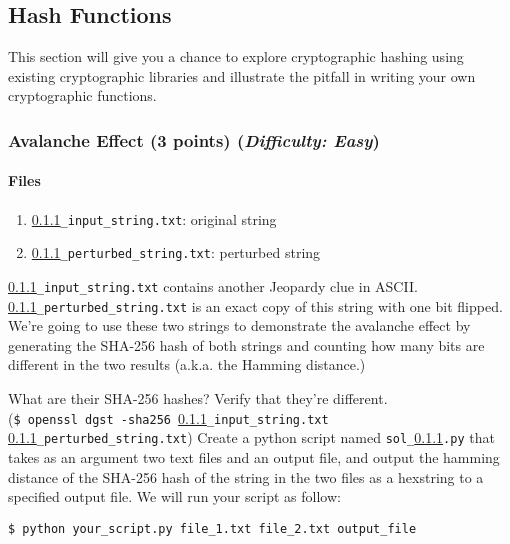 \documentclass[letterpaper,12pt]{report}
\begin{document}
\subsection{Hash Functions}
\label{sec:hash_library}
This section will give you a chance to explore cryptographic hashing using existing cryptographic libraries and illustrate the pitfall in writing your own cryptographic functions.

\subsubsection{Avalanche Effect (3 points)  \hfill\rm\normalsize (\emph{Difficulty: Easy})}
\label{sec:avalanche_effect}
\paragraph{Files}

\begin{enumerate}
\item {\tt \ref{sec:avalanche_effect}\_input\_string.txt}: original string
\item {\tt \ref{sec:avalanche_effect}\_perturbed\_string.txt}: perturbed string
\end{enumerate}

{\tt \ref{sec:avalanche_effect}\_input\_string.txt} contains another Jeopardy clue in ASCII. 
\newline
{\tt \ref{sec:avalanche_effect}\_perturbed\_string.txt} is an exact copy of this string with one bit flipped. We're going to use these two strings to demonstrate the avalanche effect by generating the SHA-256 hash of both strings and counting how many bits are different in the two results (a.k.a. the Hamming distance.)

\smallskip
What are their SHA-256 hashes?  Verify that they're different.\\
(\texttt{\$ openssl dgst -sha256 \ref{sec:avalanche_effect}\_input\_string.txt \ref{sec:avalanche_effect}\_perturbed\_string.txt})
\smallskip
Create a python script named \texttt{sol\_\ref{sec:avalanche_effect}.py} that takes as an argument two text files and an output file, and output the hamming distance of the SHA-256 hash of the string in the two files as a hexstring to a specified output file.  We will run your script as follow:
\begin{mdframed}
\begin{verbatim}
$ python your_script.py file_1.txt file_2.txt output_file
\end{verbatim}
\end{mdframed}
\end{document}
